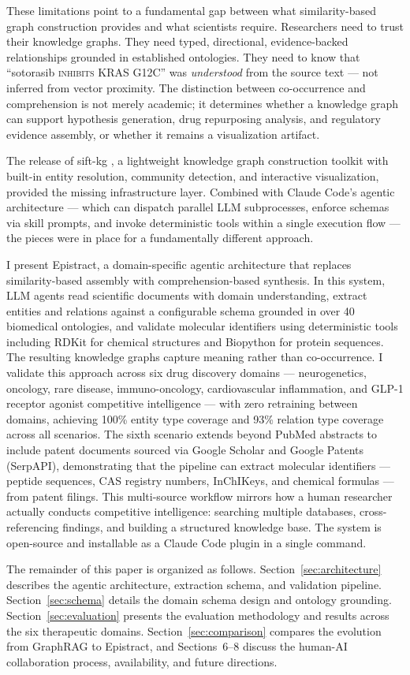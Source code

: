 These limitations point to a fundamental gap between what similarity-based graph construction provides and what scientists require. Researchers need to trust their knowledge graphs. They need typed, directional, evidence-backed relationships grounded in established ontologies. They need to know that ``sotorasib \textsc{inhibits} KRAS G12C'' was \emph{understood} from the source text --- not inferred from vector proximity. The distinction between co-occurrence and comprehension is not merely academic; it determines whether a knowledge graph can support hypothesis generation, drug repurposing analysis, and regulatory evidence assembly, or whether it remains a visualization artifact.

The release of sift-kg \cite{sifkg2024}, a lightweight knowledge graph construction toolkit with built-in entity resolution, community detection, and interactive visualization, provided the missing infrastructure layer. Combined with Claude Code's agentic architecture --- which can dispatch parallel LLM subprocesses, enforce schemas via skill prompts, and invoke deterministic tools within a single execution flow --- the pieces were in place for a fundamentally different approach.

I present Epistract, a domain-specific agentic architecture that replaces similarity-based assembly with comprehension-based synthesis. In this system, LLM agents read scientific documents with domain understanding, extract entities and relations against a configurable schema grounded in over 40 biomedical ontologies, and validate molecular identifiers using deterministic tools including RDKit for chemical structures and Biopython for protein sequences. The resulting knowledge graphs capture meaning rather than co-occurrence. I validate this approach across six drug discovery domains --- neurogenetics, oncology, rare disease, immuno-oncology, cardiovascular inflammation, and GLP-1 receptor agonist competitive intelligence --- with zero retraining between domains, achieving 100\% entity type coverage and 93\% relation type coverage across all scenarios. The sixth scenario extends beyond PubMed abstracts to include patent documents sourced via Google Scholar and Google Patents (SerpAPI), demonstrating that the pipeline can extract molecular identifiers --- peptide sequences, CAS registry numbers, InChIKeys, and chemical formulas --- from patent filings. This multi-source workflow mirrors how a human researcher actually conducts competitive intelligence: searching multiple databases, cross-referencing findings, and building a structured knowledge base. The system is open-source and installable as a Claude Code plugin in a single command.

The remainder of this paper is organized as follows. Section~\ref{sec:architecture} describes the agentic architecture, extraction schema, and validation pipeline. Section~\ref{sec:schema} details the domain schema design and ontology grounding. Section~\ref{sec:evaluation} presents the evaluation methodology and results across the six therapeutic domains. Section~\ref{sec:comparison} compares the evolution from GraphRAG to Epistract, and Sections~6--8 discuss the human-AI collaboration process, availability, and future directions.
